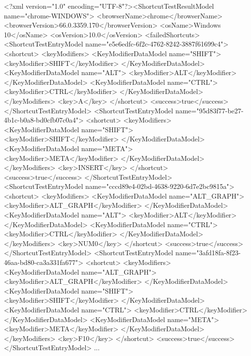 \vspace{-5px}
	\begin{spacing}{0.75}
		\begin{xmlcode}[firstnumber=1]
<?xml version="1.0" encoding="UTF-8"?><ShortcutTestResultModel name="chrome-WINDOWS">
  <browserName>chrome</browserName>
  <browserVersion>66.0.3359.170</browserVersion>
  <osName>Windows 10</osName>
  <osVersion>10.0</osVersion>
  <failedShortcuts>
    <ShortcutTestEntryModel name="e5e6edfc-6f2c-4762-8242-3887f61699c4">
      <shortcut>
        <keyModifiers>
          <KeyModifierDataModel name="SHIFT">
            <keyModifier>SHIFT</keyModifier>
          </KeyModifierDataModel>
          <KeyModifierDataModel name="ALT">
            <keyModifier>ALT</keyModifier>
          </KeyModifierDataModel>
          <KeyModifierDataModel name="CTRL">
            <keyModifier>CTRL</keyModifier>
          </KeyModifierDataModel>
        </keyModifiers>
        <key>A</key>
      </shortcut>
      <success>true</success>
    </ShortcutTestEntryModel>
    <ShortcutTestEntryModel name="95d83f77-be27-4b1c-b0a8-bd0cfb07c0a4">
      <shortcut>
        <keyModifiers>
          <KeyModifierDataModel name="SHIFT">
            <keyModifier>SHIFT</keyModifier>
          </KeyModifierDataModel>
          <KeyModifierDataModel name="META">
            <keyModifier>META</keyModifier>
          </KeyModifierDataModel>
        </keyModifiers>
        <key>INSERT</key>
      </shortcut>
      <success>true</success>
    </ShortcutTestEntryModel>
    <ShortcutTestEntryModel name="cccd89e4-02bd-4638-9220-6d7e2bc9815a">
      <shortcut>
        <keyModifiers>
          <KeyModifierDataModel name="ALT_GRAPH">
            <keyModifier>ALT_GRAPH</keyModifier>
          </KeyModifierDataModel>
          <KeyModifierDataModel name="ALT">
            <keyModifier>ALT</keyModifier>
          </KeyModifierDataModel>
          <KeyModifierDataModel name="CTRL">
            <keyModifier>CTRL</keyModifier>
          </KeyModifierDataModel>
        </keyModifiers>
        <key>NUM0</key>
      </shortcut>
      <success>true</success>
    </ShortcutTestEntryModel>
    <ShortcutTestEntryModel name="3afd18fa-8f23-46aa-bd80-ca3a331fa677">
      <shortcut>
        <keyModifiers>
          <KeyModifierDataModel name="ALT_GRAPH">
            <keyModifier>ALT_GRAPH</keyModifier>
          </KeyModifierDataModel>
          <KeyModifierDataModel name="SHIFT">
            <keyModifier>SHIFT</keyModifier>
          </KeyModifierDataModel>
          <KeyModifierDataModel name="CTRL">
            <keyModifier>CTRL</keyModifier>
          </KeyModifierDataModel>
          <KeyModifierDataModel name="META">
            <keyModifier>META</keyModifier>
          </KeyModifierDataModel>
        </keyModifiers>
        <key>F10</key>
      </shortcut>
      <success>true</success>
    </ShortcutTestEntryModel>
    ...
\end{xmlcode}
\end{spacing}